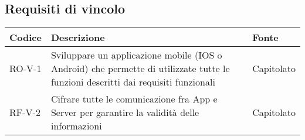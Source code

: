 \subsection{Requisiti di vincolo}
\begin{center}
\renewcommand{\arraystretch}{1.8} %
\begin{tabular}{ | m{8em} | m{18em} | m{12em} | }
\hline
Codice&Descrizione&Fonte\\
\hline
RO-V-1&Sviluppare un applicazione mobile (IOS o Android) che permette di utilizzate tutte le funzioni descritti dai requisiti funzionali&Capitolato\\
\hline
RF-V-2&Cifrare tutte le comunicazione fra App e Server per garantire la validità delle informazioni&Capitolato\\
\hline
\end{tabular}
\end{center}
